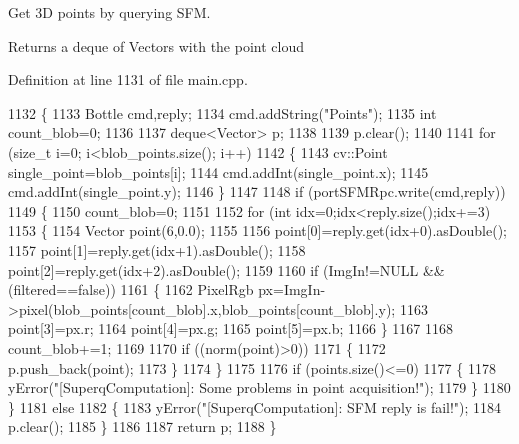 Get 3D points by querying S\+FM. 

\begin{DoxyReturn}{Returns}
a deque of Vectors with the point cloud 
\end{DoxyReturn}


Definition at line 1131 of file main.\+cpp.


\begin{DoxyCode}
1132     \{
1133         Bottle cmd,reply;
1134         cmd.addString(\textcolor{stringliteral}{"Points"});
1135         \textcolor{keywordtype}{int} count\_blob=0;
1136 
1137         deque<Vector> p;
1138 
1139         p.clear();
1140 
1141         \textcolor{keywordflow}{for} (\textcolor{keywordtype}{size\_t} i=0; i<blob\_points.size(); i++)
1142         \{
1143             cv::Point single\_point=blob\_points[i];
1144             cmd.addInt(single\_point.x);
1145             cmd.addInt(single\_point.y);
1146         \}
1147 
1148         \textcolor{keywordflow}{if} (portSFMRpc.write(cmd,reply))
1149         \{
1150             count\_blob=0;
1151 
1152             \textcolor{keywordflow}{for} (\textcolor{keywordtype}{int} idx=0;idx<reply.size();idx+=3)
1153             \{
1154                 Vector point(6,0.0);
1155 
1156                 point[0]=reply.get(idx+0).asDouble();
1157                 point[1]=reply.get(idx+1).asDouble();
1158                 point[2]=reply.get(idx+2).asDouble();
1159 
1160                 \textcolor{keywordflow}{if} (ImgIn!=NULL && (filtered==\textcolor{keyword}{false}))
1161                 \{
1162                     PixelRgb px=ImgIn->pixel(blob\_points[count\_blob].x,blob\_points[count\_blob].y);
1163                     point[3]=px.r;
1164                     point[4]=px.g;
1165                     point[5]=px.b;
1166                 \}
1167 
1168                 count\_blob+=1;
1169 
1170                 \textcolor{keywordflow}{if} ((norm(point)>0))
1171                 \{
1172                     p.push\_back(point);
1173                 \}
1174             \}
1175 
1176             \textcolor{keywordflow}{if} (points.size()<=0)
1177             \{
1178                 yError(\textcolor{stringliteral}{"[SuperqComputation]: Some problems in point acquisition!"});
1179             \}
1180         \}
1181         \textcolor{keywordflow}{else}
1182         \{
1183             yError(\textcolor{stringliteral}{"[SuperqComputation]: SFM reply is fail!"});
1184             p.clear();
1185         \}
1186 
1187         \textcolor{keywordflow}{return} p;
1188     \}
\end{DoxyCode}
